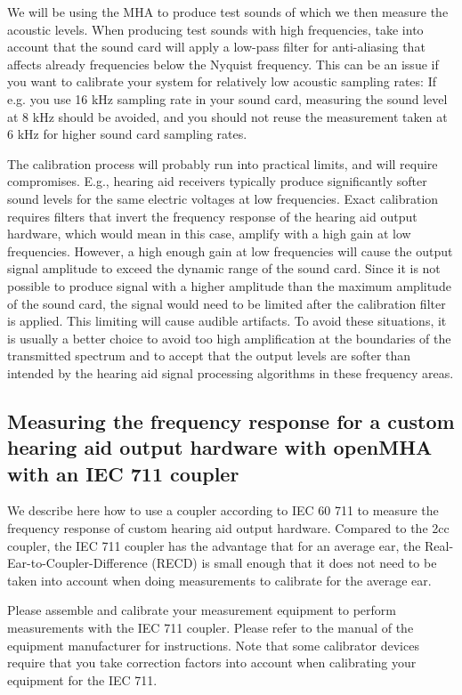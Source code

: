 \documentclass[11pt,a4paper,twoside]{article}
\newcommand{\+}{\discretionary{\mbox{\scriptsize$\hookleftarrow$}}{}{}}
\begin{document}
We will be using the MHA to produce test sounds of which we then
measure the acoustic levels.
%
When producing test sounds with high frequencies, take into account
that the sound card will apply a low-pass filter for anti-aliasing
that affects already frequencies below the Nyquist frequency.
%
This can be an issue if you want to calibrate your system for
relatively low acoustic sampling rates: If e.g. you use 16 kHz
sampling rate in your sound card, measuring the sound level at 8 kHz
should be avoided, and you should not reuse the measurement taken at 6
kHz for higher sound card sampling rates.

The calibration process will probably run into practical limits, and
will require compromises.
%
E.g., hearing aid receivers typically produce significantly softer
sound levels for the same electric voltages at low frequencies.
%
Exact calibration requires filters that invert the frequency response
of the hearing aid output hardware, which would mean in this case,
amplify with a high gain at low frequencies.
%
However, a high enough gain at low frequencies will cause the output
signal amplitude to exceed the dynamic range of the sound card.
%
Since it is not possible to produce signal with a higher amplitude
than the maximum amplitude of the sound card, the signal would need to
be limited after the calibration filter is applied. This limiting will
cause audible artifacts.
%
To avoid these situations, it is usually a better choice to avoid too
high amplification at the boundaries of the transmitted spectrum and
to accept that the output levels are softer than intended by the
hearing aid signal processing algorithms in these frequency areas.

\subsection{Measuring the frequency response for a custom hearing aid output hardware with openMHA with an IEC 711 coupler}

We describe here how to use a coupler according to IEC 60 711 to
measure the frequency response of custom hearing aid output hardware.
%
Compared to the 2cc coupler, the IEC 711 coupler has the advantage
that for an average ear, the Real-Ear-to-Coupler-Difference (RECD) is
small enough that it does not need to be taken into account when doing
measurements to calibrate for the average ear.

Please assemble and calibrate your measurement equipment to perform
measurements with the IEC 711 coupler.
%
Please refer to the manual of the equipment manufacturer for
instructions.
%
Note that some calibrator devices require that you take correction
factors into account when calibrating your equipment for the IEC 711.
\end{document}
